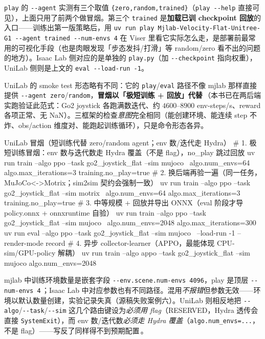 \begin{note}
\verb|play| 的 \verb|--agent| 实测有三个取值 \verb|{zero,random,trained}|（\verb|play --help| 直接可见），上面只用了前两个做冒烟。第三个 \verb|trained| 是\textbf{加载已训 checkpoint 回放}的入口——训练出第一版策略后，用 \verb|uv run play Mjlab-Velocity-Flat-Unitree-G1 --agent trained --num-envs 4| 在 Viser 里看它实际怎么走，是部署前最常用的可视化手段（也是肉眼发现「步态发抖/打滑」等 random/zero 看不出的问题的地方）。Isaac Lab 侧对应的是单独的 \verb|play.py|（加 \verb|--checkpoint| 指向权重），UniLab 侧则是上文的 \verb|eval --load-run -1|。
\end{note}

UniLab 的 smoke test 形态略有不同：它的 \verb|play|/\verb|eval| 路径不像 mjlab 那样直接提供 \verb|--agent zero|/\verb|random|，\textbf{冒烟以「极短训练 + 回放」代替}\,\cite{unilab2026}（本书已在两后端实跑验证此范式：Go2 joystick 各跑满数迭代、约 $4600$--$8900$ env-steps/s、reward 各项正常、无 NaN）。三框架的检查\emph{意图}完全相同（能创建环境、能连续 step 不炸、obs/action 维度对、能跑起训练循环），只是命令形态各异。

\begin{codebox}[bash]{UniLab 冒烟（短训练代替 zero/random agent；env 数/迭代走 Hydra）}
# 1. 极短训练冒烟：env 数与迭代数走 Hydra 覆盖（不是 flag），no_play 跳过回放
uv run train --algo ppo --task go2_joystick_flat --sim mujoco \
    algo.num_envs=64 algo.max_iterations=3 training.no_play=true
# 2. 换后端再验一遍（同一任务，MuJoCo<->Motrix；sim2sim 契约会强制一致）
uv run train --algo ppo --task go2_joystick_flat --sim motrix \
    algo.num_envs=64 algo.max_iterations=3 training.no_play=true
# 3. 中等规模 + 回放并导出 ONNX（eval 阶段才导 policy.onnx + onnxruntime 自验）
uv run train --algo ppo --task go2_joystick_flat --sim mujoco \
    algo.num_envs=2048 algo.max_iterations=300
uv run eval  --algo ppo --task go2_joystick_flat --sim mujoco \
    --load-run -1 --render-mode record
# 4. 异步 collector-learner（APPO，最能体现 CPU-sim/GPU-policy 解耦）
uv run train --algo appo --task go2_joystick_flat --sim mujoco algo.num_envs=2048
\end{codebox}

\begin{pitfall}[train/play 的 CLI 参数别混用（三框架各有各的坑）]
mjlab 中训练环境数量是嵌套字段 \verb|--env.scene.num-envs 4096|，play 是顶层 \verb|--num-envs 4|\,\cite{mjlab2026}；Isaac Lab 中对应参数也有不同路径。混用\emph{不报错}但参数无效——环境以默认数量创建，实验记录失真（源稿失败案例六）。UniLab 则相反地把 \verb|--algo|/\verb|--task|/\verb|--sim| 这几个路由键设为\emph{必须用 flag}（RESERVED，Hydra 透传会直接 \verb|SystemExit|），而 env 数/迭代数\emph{必须走 Hydra 覆盖}（\verb|algo.num_envs=...|，不是 flag）——写反了同样得不到预期配置\,\cite{unilab2026}。
\end{pitfall}

